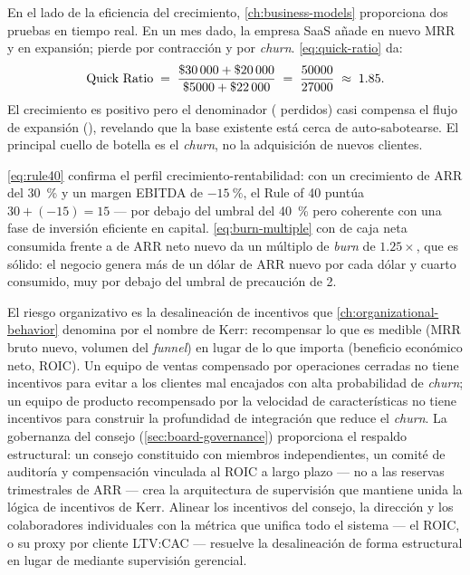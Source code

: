 En el lado de la eficiencia del crecimiento, \cref{ch:business-models} proporciona dos pruebas
en tiempo real. En un mes dado, la empresa SaaS añade  en nuevo MRR y
 en expansión; pierde  por contracción y  por
\emph{churn}. \cref{eq:quick-ratio} da:
\[
  \text{Quick Ratio} \;=\; \frac{\$\num{30000}+\$\num{20000}}{\$\num{5000}+\$\num{22000}}
    \;=\; \frac{50000}{27000} \;\approx\; 1.85.
\]
El crecimiento es positivo pero el denominador ( perdidos) casi compensa el flujo
de expansión (), revelando que la base existente está cerca de auto-sabotearse. El
principal cuello de botella es el \emph{churn}, no la adquisición de nuevos clientes.

\cref{eq:rule40} confirma el perfil crecimiento-rentabilidad: con un crecimiento de ARR del
\qty{30}{\percent} y un margen EBITDA de \(\qty{-15}{\percent}\), el Rule of 40 puntúa
\(30 + (-15) = 15\) --- por debajo del umbral del \qty{40}{\percent} pero coherente con una
fase de inversión eficiente en capital. \cref{eq:burn-multiple} con  de caja
neta consumida frente a  de ARR neto nuevo da un múltiplo de \emph{burn} de
\(1.25\times\), que es sólido: el negocio genera más de un dólar de ARR nuevo por cada dólar
y cuarto consumido, muy por debajo del umbral de precaución de 2.

El riesgo organizativo es la desalineación de incentivos que \cref{ch:organizational-behavior}
denomina por el nombre de Kerr: recompensar lo que es medible (MRR bruto nuevo, volumen del
\emph{funnel}) en lugar de lo que importa (beneficio económico neto, ROIC). Un equipo de ventas
compensado por operaciones cerradas no tiene incentivos para evitar a los clientes mal encajados
con alta probabilidad de \emph{churn}; un equipo de producto recompensado por la velocidad de
características no tiene incentivos para construir la profundidad de integración que reduce el
\emph{churn}. La gobernanza del consejo (\cref{sec:board-governance}) proporciona el respaldo
estructural: un consejo constituido con miembros independientes, un comité de auditoría y
compensación vinculada al ROIC a largo plazo --- no a las reservas trimestrales de ARR ---
crea la arquitectura de supervisión que mantiene unida la lógica de incentivos de Kerr. Alinear
los incentivos del consejo, la dirección y los colaboradores individuales con la métrica que
unifica todo el sistema --- el ROIC, o su proxy por cliente LTV:CAC --- resuelve la
desalineación de forma estructural en lugar de mediante supervisión gerencial.

